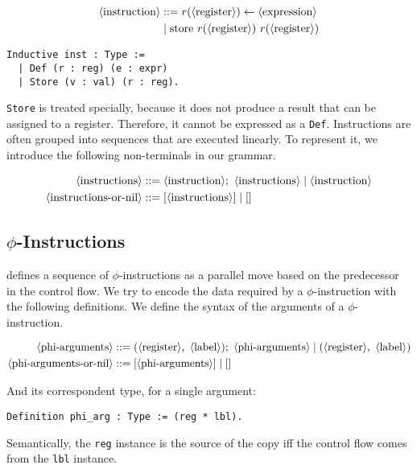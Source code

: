 \begin{align*}
\langle\text{instruction}\rangle &::= r( \langle\text{register}\rangle ) \leftarrow \langle\text{expression}\rangle \\
&\mid \text{store} \ r( \langle\text{register}\rangle ) \ r( \langle\text{register}\rangle )
\end{align*}

\begin{lstlisting}[style=Rocq]
Inductive inst : Type :=
  | Def (r : reg) (e : expr)
  | Store (v : val) (r : reg).
\end{lstlisting}

\texttt{Store} is treated specially, because it does not produce a result that can be assigned to a register. Therefore, it cannot be expressed as a \texttt{Def}.
Instructions are often grouped into sequences that are executed linearly. To represent it, we introduce the following non-terminals in our grammar.

\begin{align*}
\langle\text{instructions}\rangle &::= \langle\text{instruction}\rangle ; \ \langle\text{instructions}\rangle \mid \langle\text{instruction}\rangle \\
\langle\text{instructions-or-nil}\rangle &::= [ \langle\text{instructions}\rangle ] \mid []
\end{align*}

\subsection{$\phi$-Instructions}

 defines a sequence of $\phi$-instructions as a parallel move based on the predecessor in the control flow.
We try to encode the data required by a $\phi$-instruction with the following definitions. We define the syntax of the arguments of a $\phi$-instruction.

\begin{align*}
\nt{phi-arguments} &::= ( \nt{register} , \ \nt{label} ) ; \ \nt{phi-arguments} \mid (\nt{register} , \ \nt{label}) \\
\nt{phi-arguments-or-nil} &::= [ \nt{phi-arguments} ] \mid []
\end{align*}

And its correspondent type, for a single argument:

\begin{lstlisting}[style=Rocq]
Definition phi_arg : Type := (reg * lbl).
\end{lstlisting}

Semantically, the \texttt{reg} instance is the source of the copy iff the control flow comes from the \texttt{lbl} instance.

